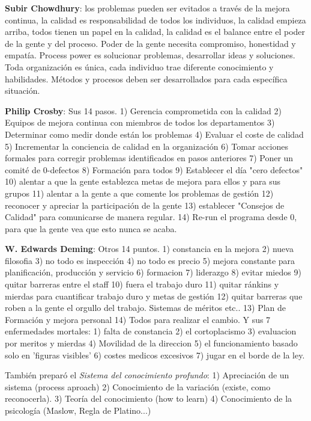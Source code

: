 \documentclass[]{article}
\begin{document}
\textbf{Subir Chowdhury}: los problemas pueden ser evitados a través de la mejora continua, la calidad es responsabilidad de todos los individuos, la calidad empieza arriba, todos tienen un papel en la calidad, la calidad es el balance entre el poder de la gente y del proceso. Poder de la gente necesita compromiso, honestidad y empatía. Process power es solucionar problemas, desarrollar ideas y soluciones. Toda organización es única, cada individuo trae diferente conocimiento y habilidades. Métodos y procesos deben ser desarrollados para cada específica situación.

\textbf{Philip Crosby}: Sus 14 pasos. 1) Gerencia comprometida con la calidad 2) Equipos de mejora continua con miembros de todos los departamentos 3) Determinar como medir donde están los problemas 4) Evaluar el coste de calidad 5) Incrementar la conciencia de calidad en la organización 6) Tomar acciones formales para corregir problemas identificados en pasos anteriores 7) Poner un comité de 0-defectos 8) Formación para todos 9) Establecer el día "cero defectos" 10) alentar a que la gente establezca metas de mejora para ellos y para sus grupos 11) alentar a la gente a que comente los problemas de gestión 12) reconocer y apreciar la participación de la gente 13) establecer "Consejos de Calidad" para comunicarse de manera regular. 14) Re-run el programa desde 0, para que la gente vea que esto nunca se acaba. 

\textbf{W. Edwards Deming}: Otros 14 puntos. 1) constancia en la mejora 2) nueva filosofia 3) no todo es inspección 4) no todo es precio 5) mejora constante para planificación, producción y servicio 6) formacion 7) liderazgo 8) evitar miedos 9) quitar barreras entre el staff 10) fuera el trabajo duro 11) quitar ránkins y mierdas para cuantificar trabajo duro y metas de gestión 12) quitar barreras que roben a la gente el orgullo del trabajo. Sistemas de méritos etc.. 13) Plan de Formación y mejora personal 14) Todos para realizar el cambio. Y sus 7 enfermedades mortales: 1) falta de constancia 2) el cortoplacismo 3) evaluacion por meritos y mierdas 4) Movilidad de la direccion 5) el funcionamiento basado solo en 'figuras visibles' 6) costes medicos excesivos 7) jugar en el borde de la ley. 

También preparó el \textit{Sistema del conocimiento profundo}: 1) Apreciación de un sistema (process aproach) 2) Conocimiento de la variación (existe, como reconocerla). 3) Teoría del conocimiento (how to learn) 4) Conocimiento de la psicología (Maslow, Regla de Platino...) 
\end{document}

